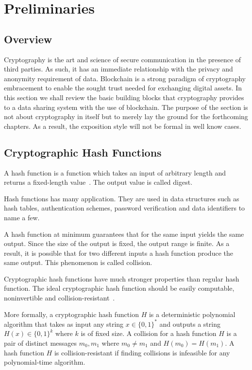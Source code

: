 \chapter{Preliminaries}
\label{preliminaries}

\section{Overview}
\label{preliminaries:overview}

Cryptography is the art and science of secure communication in the presence of third parties. As such, it has an immediate relationship with the privacy and anonymity requirement of data. Blockchain is a strong paradigm of cryptography embracement to enable the sought trust needed for exchanging digital assets. In this section we shall review the basic building blocks that cryptography provides to a data sharing system with the use of blockchain. The purpose of the section is not about cryptography in itself but to merely lay the ground for the forthcoming chapters. As a result, the exposition style will not be formal in well know cases.

\section{Cryptographic Hash Functions}
\label{preliminaries:hash}

A hash function is a function which takes an input of arbitrary length and returns a fixed-length value~\cite{crypto_101,boneh_crypto,kiagias:crypto,Katz:2014:IMC:2700550}. The output value is called digest.

Hash functions has many application. They are used in data structures such as hash tables, authentication schemes, password verification and data identifiers to name a few.

A hash function at minimum guarantees that for the same input yields the same output. Since the size of the output is fixed, the output range is finite. As a result, it is possible that for two different inputs a hash function produce the same output. This phenomenon is called collision.

Cryptographic hash functions have much stronger properties than regular hash function. The ideal cryptographic hash function should be easily computable, noninvertible and collision-resistant~\cite{Katz:2014:IMC:2700550, kiagias:crypto, crypto_101}.

More formally, a cryptographic hash function $H$ is a deterministic polynomial algorithm that takes as input any string $x \in \{0, 1\}^{*}$ and outputs a string $H(x) \in \{0, 1\}^{k}$ where $k$ is of fixed size. A collision for a hash function $H$ is a pair of distinct messages $m_0, m_1$ where $m_0 \neq m_1$ and $H(m_0) = H(m_1)$. A hash function $H$ is collision-resistant if finding collisions is infeasible for any polynomial-time algorithm.

